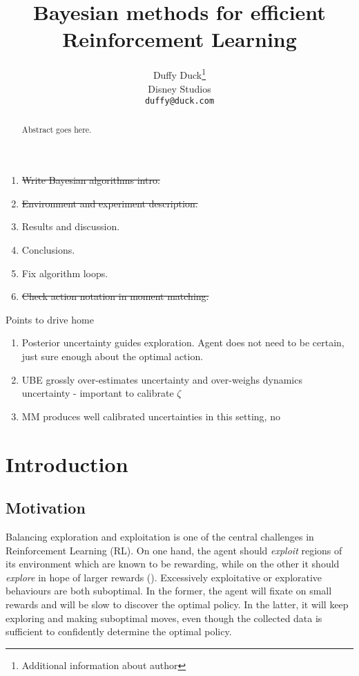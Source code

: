 \documentclass{article}
\title{Bayesian methods for efficient\\Reinforcement Learning}
\author{%
  Duffy Duck\thanks{Additional information about author} \\
  Disney Studios\\
  \texttt{duffy@duck.com} \\
}
\begin{document}
\begin{enumerate}
\item \st{Write Bayesian algorithms intro.}
\item \st{Environment and experiment description.}
\item Results and discussion.
\item Conclusions.
\item Fix algorithm loops.
\item \st{Check action notation in moment matching.}
\end{enumerate}

Points to drive home
\begin{enumerate}
\item Posterior uncertainty guides exploration. Agent does not need to be certain, just sure enough about the optimal action.
\item UBE grossly over-estimates uncertainty and over-weighs dynamics uncertainty - important to calibrate $\zeta$
\item MM produces well calibrated uncertainties in this setting, no
\end{enumerate}

\clearpage
\maketitle

\begin{abstract}
  Abstract goes here.
\end{abstract}

\section{Introduction}

\subsection{Motivation}

Balancing exploration and exploitation is one of the central challenges in Reinforcement Learning (RL). On one hand, the agent should \textit{exploit} regions of its environment which are known to be rewarding, while on the other it should \textit{explore} in hope of larger rewards (\cite{suttonbarto}). Excessively exploitative or explorative behaviours are both suboptimal. In the former, the agent will fixate on small rewards and will be slow to discover the optimal policy. In the latter, it will keep exploring and making suboptimal moves, even though the collected data is sufficient to confidently determine the optimal policy.
\end{document}
